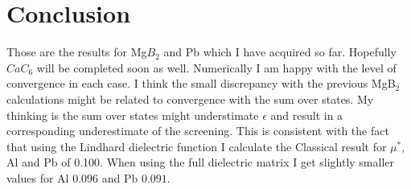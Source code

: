 \documentclass{article}
\begin{document}
\section{Conclusion}
%
Those are the results for Mg$B_{2}$ and Pb which I have acquired so far.
Hopefully $CaC_{6}$ will be completed soon as well. Numerically I am happy
with the level of convergence in each case. I think the small discrepancy
with the previous MgB$_{2}$ calculations might be related to convergence with
the sum over states. My thinking is the sum over
states might understimate $\epsilon$ and result in a corresponding underestimate of the
screening. This is consistent with the fact that using the Lindhard dielectric
function I calculate the Classical result for $\mu^{*}$, Al and Pb of 0.100. When using the
full dielectric matrix I get slightly smaller values for Al $0.096$ and Pb $0.091$. 
\end{document}
